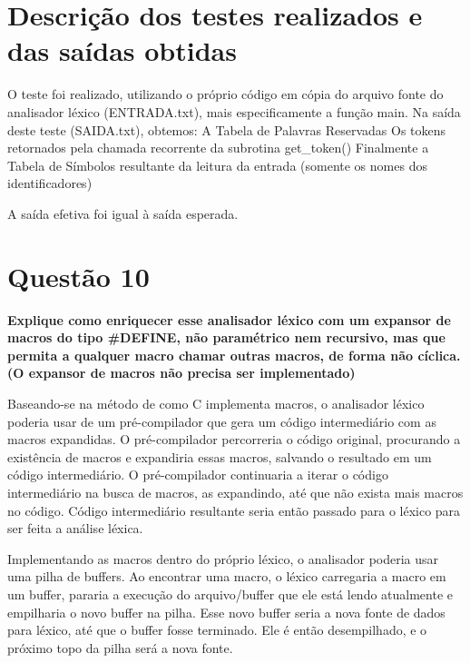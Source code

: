 \documentclass[
	article,			%
	11pt,				%
	oneside,			%
	a4paper,			%
	english,			%
	brazil,				%
	]{abntex2}
\begin{document}
\section{Descrição dos testes realizados e das saídas obtidas}

O teste foi realizado, utilizando o próprio código em cópia do arquivo fonte do analisador léxico (ENTRADA.txt), mais especificamente a função main.
Na saída deste teste (SAIDA.txt), obtemos:
A Tabela de Palavras Reservadas
Os tokens retornados pela chamada recorrente da subrotina get\_token()
Finalmente a Tabela de Símbolos resultante da leitura da entrada (somente os nomes dos identificadores) 

A saída efetiva foi igual à saída esperada.

\section{Questão 10}
\textbf{Explique como enriquecer esse analisador léxico com um expansor de macros do tipo \#DEFINE, não paramétrico nem recursivo, mas que permita a qualquer macro chamar outras macros, de forma não cíclica. (O expansor de macros não precisa ser implementado)} 

Baseando-se na método de como C implementa macros, o analisador léxico poderia usar de um pré-compilador que gera um código intermediário com as macros expandidas. O pré-compilador percorreria o código original, procurando a existência de macros e expandiria essas macros, salvando o resultado em um código intermediário. O pré-compilador continuaria a iterar o código intermediário na busca de macros, as expandindo, até que não exista mais macros no código. Código intermediário resultante seria então passado para o léxico para ser feita a análise léxica.

Implementando as macros dentro do próprio léxico, o analisador poderia usar uma pilha de buffers. Ao encontrar uma macro, o léxico carregaria a macro em um buffer, pararia a execução do arquivo/buffer que ele está lendo atualmente e empilharia o novo buffer na pilha. Esse novo buffer seria a nova fonte de dados para léxico, até que o buffer fosse terminado. Ele é então desempilhado, e o próximo topo da pilha será a nova fonte.
\end{document}
